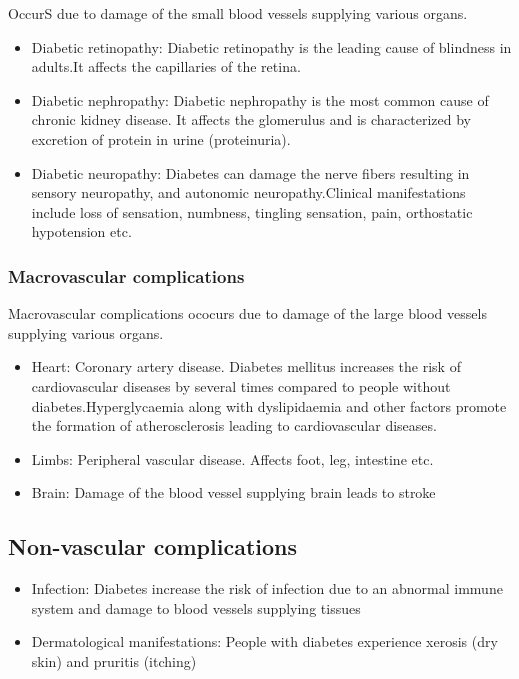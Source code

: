 \documentclass[
]{book}
\begin{document}
OccurS due to damage of the small blood vessels supplying various organs.

\begin{itemize}
\item
  Diabetic retinopathy: Diabetic retinopathy is the leading cause of blindness in adults.It affects the capillaries of the retina.
\item
  Diabetic nephropathy: Diabetic nephropathy is the most common cause of chronic kidney disease. It affects the glomerulus and is characterized by excretion of protein in urine (proteinuria).
\item
  Diabetic neuropathy: Diabetes can damage the nerve fibers resulting in sensory neuropathy, and autonomic neuropathy.Clinical manifestations include loss of sensation, numbness, tingling sensation, pain, orthostatic hypotension etc.
\end{itemize}

\subsubsection{Macrovascular complications}\label{macrovascular-complications}

Macrovascular complications ococurs due to damage of the large blood vessels supplying various organs.

\begin{itemize}
\item
  Heart: Coronary artery disease. Diabetes mellitus increases the risk of cardiovascular diseases by several times compared to people without diabetes.Hyperglycaemia along with dyslipidaemia and other factors promote the formation of atherosclerosis leading to cardiovascular diseases.
\item
  Limbs: Peripheral vascular disease. Affects foot, leg, intestine etc.
\item
  Brain: Damage of the blood vessel supplying brain leads to stroke
\end{itemize}

\subsection{Non-vascular complications}\label{non-vascular-complications}

\begin{itemize}
\item
  Infection: Diabetes increase the risk of infection due to an abnormal immune system and damage to blood vessels supplying tissues
\item
  Dermatological manifestations: People with diabetes experience xerosis (dry skin) and pruritis (itching)
\end{itemize}
\end{document}
